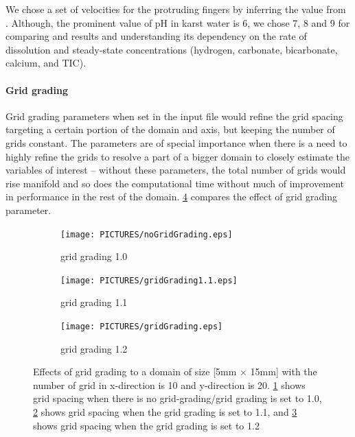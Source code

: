 We chose a set of velocities for the protruding fingers by inferring the value from \citet{Class2020}. 
Although, the prominent value of pH in karst water is 6, we chose 7, 8 and 9 for comparing \DuMuX and 
\MATLAB results and understanding its dependency on the rate of dissolution and steady-state concentrations 
(hydrogen, carbonate, bicarbonate, calcium, and TIC). \\

\paragraph*{Grid grading}\mbox{} Grid grading parameters when set in the input file would refine the grid 
spacing targeting a certain portion of the domain and axis, but keeping the number of grids constant. 
The parameters are of special importance when there is a need to highly refine the grids to resolve a part 
of a bigger domain to closely estimate the variables of interest -- without these parameters, the total number 
of grids would rise manifold and so does the computational time without much of improvement in performance in 
the rest of the domain. \cref{fig:gridGrading} compares the effect of grid grading parameter. \\
\begin{figure}[!h]
        \centering
    \begin{subfigure}{.3\linewidth}
        \centering
        \texttt{[image: PICTURES/noGridGrading.eps]}
        \caption{grid grading 1.0}
        \label{fig:nogg}       %
    \end{subfigure}%
        \hfill
    \begin{subfigure}{.3\linewidth}
        \centering
        \texttt{[image: PICTURES/gridGrading1.1.eps]}
        \caption{grid grading 1.1}
        \label{fig:gg1.1}       %
    \end{subfigure}%
    \hfill
    \begin{subfigure}{.3\linewidth}
        \centering
        \texttt{[image: PICTURES/gridGrading.eps]}
        \caption{grid grading 1.2}
        \label{fig:gg1.2}       %
    \end{subfigure}%
        \hfill
     \caption{Effects of grid grading to a domain of size [5mm $\times$ 15mm] with the number of grid in x-direction is 
     10 and y-direction is 20. \cref{fig:nogg} shows grid spacing when there is no grid-grading/grid grading is set to 1.0, 
     \cref{fig:gg1.1} shows grid spacing when the grid grading is set to 1.1, and \cref{fig:gg1.2} shows grid spacing when the grid grading is set to 1.2}
     \label{fig:gridGrading}
\end{figure}


